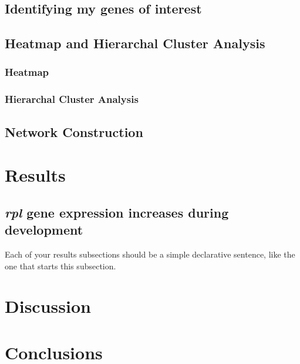 \documentclass[onecolumn]{article}
\begin{document}
\subsection{Identifying my genes of interest}
\subsection{Heatmap and Hierarchal Cluster Analysis}
\subsubsection{Heatmap}
\subsubsection{Hierarchal Cluster Analysis}
\subsection{Network Construction}

\section{Results}
\subsection{\emph{rpl} gene expression increases during development}

Each of your results subsections should be a simple declarative sentence, like the one that starts this subsection.

\section{Discussion}
\section{Conclusions}

\newpage
\newpage


\end{document}
